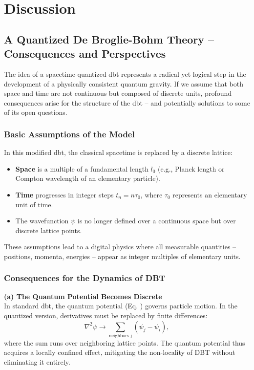 \chapter{Discussion}
\label{ch:discussion}
\section{A Quantized De Broglie-Bohm Theory – Consequences and Perspectives}
The idea of a spacetime-quantized \gls{dbt} represents a radical yet logical step in the development of a physically consistent quantum gravity.  
If we assume that both space and time are not continuous but composed of discrete units, profound consequences arise for the structure of the \gls{dbt} – and  
potentially solutions to some of its open questions.

\subsection{Basic Assumptions of the Model}
In this modified \gls{dbt}, the classical spacetime is replaced by a discrete lattice:  
\begin{itemize}  
    \item \textbf{Space} is a multiple of a fundamental length $l_0$ (e.g., Planck length or Compton wavelength of an elementary particle).  
    \item \textbf{Time} progresses in integer steps $t_n = n\tau_0$, where $\tau_0$ represents an elementary unit of time.  
    \item The wavefunction $\psi$ is no longer defined over a continuous space but over discrete lattice points.  
\end{itemize}  
These assumptions lead to a digital physics where all measurable quantities – positions, momenta, energies – appear as integer multiples of elementary units.

\subsection{Consequences for the Dynamics of DBT}  
\textbf{(a) The Quantum Potential Becomes Discrete}\\  
In standard \gls{dbt}, the quantum potential (Eq. ) governs particle motion. In the quantized version, derivatives must be replaced by finite  
differences:  
\begin{equation}  
    \nabla^{2} \psi \to \sum_\text{neighbors j} \left( \psi_j - \psi_i \right),  
\end{equation}  
where the sum runs over neighboring lattice points. The quantum potential thus acquires a locally confined effect, mitigating the non-locality of DBT without eliminating it entirely.  

